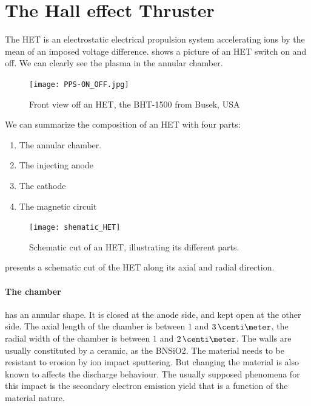 

\section{The Hall effect Thruster }
\label{sec-HET}

The \ac{HET} is an electrostatic electrical propulsion system accelerating ions by the mean of an imposed voltage difference.
 shows a picture of an \ac{HET} switch on and off.
We can clearly see the plasma in the annular chamber.


\begin{figure}[hbtp]
  \centering
  \texttt{[image: PPS-ON\_OFF.jpg]}
  \caption{Front view off an \ac{HET}, the BHT-1500 from Busek, USA}
  \label{fig-bhtonoff}
\end{figure}

We can summarize the composition of an \ac{HET} with four parts\string:
\begin{enumerate}
  \item The annular chamber.
  \item The injecting anode
  \item The cathode
  \item The magnetic circuit
\end{enumerate}

\begin{figure}[hbtp]
  \centering
  \texttt{[image: shematic\_HET]}
  \caption{Schematic cut of an \ac{HET}, illustrating its different parts. }
  \label{fig-shematiccut}
\end{figure}

 presents a schematic cut of the \ac{HET} along its axial and radial direction.

\paragraph{The chamber} has an annular shape.
It is closed at the anode side, and kept open at the other side.
The axial length of the chamber is between $1$ and $3\,\centi\meter$, the radial width of the chamber is between $1$ and $2\,\centi\meter$. 
The walls are usually constituted by a ceramic, as the \ac{BNSiO2}.
The material needs to be resistant to erosion by ion impact sputtering.
But changing the material is also known to affects the discharge behaviour.
The usually supposed phenomena for this impact is the secondary electron emission yield that is a function of the material nature.


